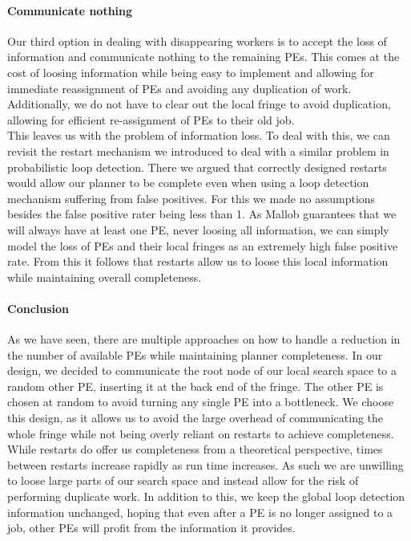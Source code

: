 \paragraph{Communicate nothing}
Our third option in dealing with disappearing workers is to accept the loss of information and communicate nothing to the remaining PEs. This comes at the cost of loosing information while being easy to implement and allowing for immediate reassignment of PEs and avoiding any duplication of work. Additionally, we do not have to clear out the local fringe to avoid duplication, allowing for efficient re-assignment of PEs to their old job. \\
This leaves us with the problem of information loss. To deal with this, we can revisit the restart mechanism we introduced to deal with a similar problem in probabilistic loop detection. There we argued that correctly designed restarts would allow our planner to be complete even when using a loop detection mechanism suffering from false positives. For this we made no assumptions besides the false positive rater being less than 1. As Mallob guarantees that we will always have at least one PE, never loosing all information, we can simply model the loss of PEs and their local fringes as an extremely high false positive rate. From this it follows that restarts allow us to loose this local information while maintaining overall completeness.

\paragraph{Conclusion}
As we have seen, there are multiple approaches on how to handle a reduction in the number of available PEs while maintaining planner completeness. In our design, we decided to communicate the root node of our local search space to a random other PE, inserting it at the back end of the fringe. The other PE is chosen at random to avoid turning any single PE into a bottleneck. We choose this design, as it allows us to avoid the large overhead of communicating the whole fringe while not being overly reliant on restarts to achieve completeness. While restarts do offer us completeness from a theoretical perspective, times between restarts increase rapidly as run time increases. As such we are unwilling to loose large parts of our search space and instead allow for the risk of performing duplicate work. In addition to this, we keep the global loop detection information unchanged, hoping that even after a PE is no longer assigned to a job, other PEs will profit from the information it provides.
\begin{comment}
- keep the search space around
- restarts offer completeness from a theoretical perspective
- however, in practice it may take a long time
- we are not willing to loose potentially very large parts of our search space
\end{comment}
			
